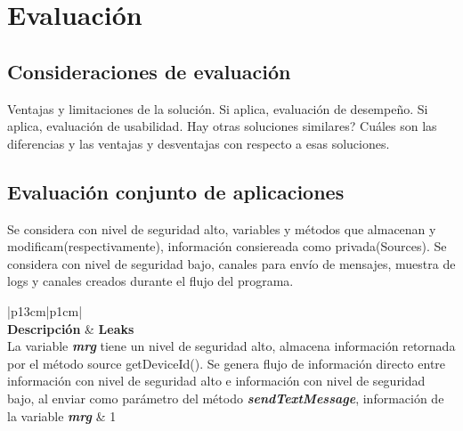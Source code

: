 \label{ch:evaluacion}
\chapter{Evaluación}
\section{Consideraciones de evaluación}
Ventajas y limitaciones de la solución.\newline 
Si aplica, evaluación de desempeño.  \newline 
Si aplica, evaluación de usabilidad.  
Hay otras soluciones similares? \newline 
Cuáles son las diferencias y las ventajas y desventajas con respecto a esas soluciones. 

\section{Evaluación conjunto de aplicaciones}

Se considera con nivel de seguridad alto, variables y métodos que almacenan y
modificam(respectivamente), información consiereada como
privada(Sources).\newline 
Se considera con nivel de seguridad bajo, canales para envío de mensajes,
muestra de logs y canales creados durante el flujo del programa.

\begin{table}[H]
\small\addtolength{\tabcolsep}{-3pt}
\caption{Descripción aplicaciones de Prueba}
\label{tb:descripApps}
\begin{tabular}{|p{13cm}|p{1cm}|}
	\hline
	\\
	\hline
	\textbf{Descripción} & \textbf{Leaks}\\
	\hline
	La variable \textit{\textbf{mrg}} tiene un nivel de seguridad alto,
	almacena información retornada por el método source getDeviceId(). Se genera
	flujo de información directo entre información con nivel de seguridad alto e
	información con nivel de seguridad bajo, al enviar como parámetro del método
	\textit{\textbf{sendTextMessage}}, información de la variable
	\textit{\textbf{mrg}} & 1
	\\
	\hline
	\hline
\end{tabular}
\end{table}

